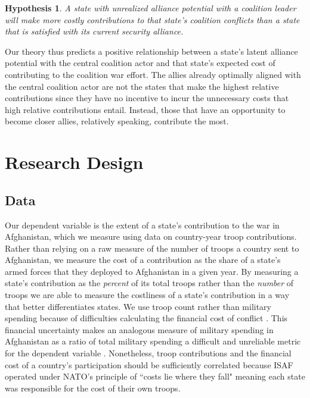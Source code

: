 \documentclass[12pt,letterpaper]{article}
\newtheorem{hyp}{Hypothesis}
\begin{document}
		\begin{hyp}
			A state with unrealized alliance potential with a coalition leader will make more costly contributions to that state's coalition conflicts than a state that is satisfied with its current security alliance.
		\end{hyp}

		Our theory thus predicts a positive relationship between a state's latent alliance potential with the central coalition actor and that state's expected cost of contributing to the coalition war effort. The allies already optimally aligned with the central coalition actor are not the states that make the highest relative contributions since they have no incentive to incur the unnecessary costs that high relative contributions entail. Instead, those that have an opportunity to become closer allies, relatively speaking, contribute the most.

\section{Research Design}
	\subsection{Data}		
		Our dependent variable is the extent of a state's contribution to the war in Afghanistan, which we measure using data on country-year troop contributions. Rather than relying on a raw measure of the number of troops a country sent to Afghanistan, we measure the cost of a contribution as the share of a state's armed forces that they deployed to Afghanistan in a given year. By measuring a state's contribution as the \emph{percent} of its total troops rather than the \emph{number} of troops we are able to measure the costliness of a state's contribution in a way that better differentiates states. We use troop count rather than military spending because of difficulties calculating the financial cost of conflict \citep{stiglitz_estimatingcostswar_2012}. This financial uncertainty makes an analogous measure of military spending in Afghanistan as a ratio of total military spending a difficult and unreliable metric for the dependent variable \citep{bruck_economiccostsgerman_2011}. Nonetheless, troop contributions and the financial cost of a country's participation should be sufficiently correlated because ISAF operated under NATO's principle of ``costs lie where they fall" meaning each state was responsible for the cost of their own troops.
		
\end{document}
